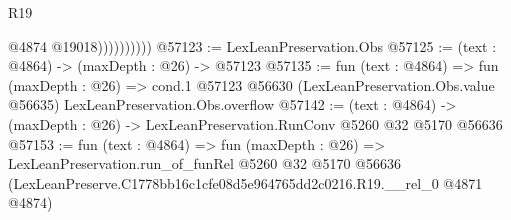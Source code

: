 \begin{lexlean}{R19}
\begin{coremodule}
                        @4874
                        @19018))))))))))
@57123 := LexLeanPreservation.Obs
@57125 := (text : @4864) -> (maxDepth : @26) -> @57123
@57135 := fun (text : @4864) =>
  fun (maxDepth : @26) =>
  cond.{1} @57123 @56630 (LexLeanPreservation.Obs.value @56635) LexLeanPreservation.Obs.overflow
@57142 := (text : @4864) -> (maxDepth : @26) -> LexLeanPreservation.RunConv @5260 @32 @5170 @56636
@57153 := fun (text : @4864) =>
  fun (maxDepth : @26) =>
  LexLeanPreservation.run_of_funRel
    @5260
    @32
    @5170
    @56636
    (LexLeanPreserve.C1778bb16c1cfe08d5e964765dd2c0216.R19.__rel_0 @4871 @4874)
\end{coremodule}
\end{lexlean}
